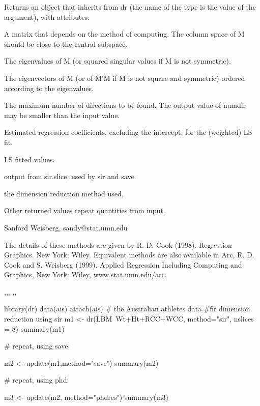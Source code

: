 \begin{Value}
Returns an object that inherits from dr (the name of the type is the
value of the  argument), with attributes:
\begin{ldescription}
\item[\code{M}] A matrix that depends on the method of computing.  The column space
of M should be close to the central subspace.
\item[\code{evalues}] The eigenvalues of M (or squared singular values if M is not
symmetric).
\item[\code{evectors}] The eigenvectors of M (or of M'M if M is not square and
symmetric) ordered according to the eigenvalues.
\item[\code{numdir}] The maximum number of directions to be found.  The output
value of numdir may be smaller than the input value.
\item[\code{ols.coef}] Estimated regression coefficients, excluding the intercept,
for the (weighted) LS fit.
\item[\code{ols.fit}] LS fitted values.
\item[\code{slice.info}] output from sir.slice, used by sir and save.
\item[\code{method}] the dimension reduction method used.
\end{ldescription}

Other returned values repeat quantities from input.\end{Value}
\begin{Author}\relax
Sanford Weisberg, 
sandy@stat.umn.edu\end{Author}
\begin{References}\relax
The details of these methods are given by R. D. Cook 
(1998).  Regression Graphics.  New York:  Wiley.  Equivalent 
methods are also available in Arc, R. D. Cook and S. Weisberg 
(1999).  Applied Regression Including Computing and Graphics, New 
York:  Wiley, www.stat.umn.edu/arc.\end{References}
\begin{SeeAlso}\relax
{},,,
,,\end{SeeAlso}
\begin{Examples}
\begin{ExampleCode}
library(dr)
data(ais)
attach(ais)  # the Australian athletes data
#fit dimension reduction using sir
m1 <- dr(LBM~Wt+Ht+RCC+WCC, method="sir", nslices = 8)
summary(m1)

# repeat, using save:

m2 <- update(m1,method="save")
summary(m2)

# repeat, using phd:

m3 <- update(m2, method="phdres")
summary(m3)
\end{ExampleCode}
\end{Examples}

